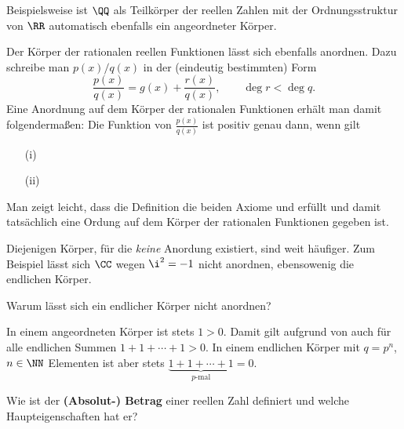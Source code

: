 \begin{antwort}
  Beispielsweise ist $\QQ$ als Teilkörper der reellen Zahlen mit der 
  Ordnungsstruktur von $\RR$ automatisch ebenfalls 
  ein angeordneter Körper. 

  Der Körper der rationalen reellen 
  Funktionen
  lässt sich ebenfalls anordnen. 
  Dazu schreibe man $p(x)/q(x)$ in der (eindeutig bestimmten) Form 
  \[
  \frac{p(x)}{q(x)} = g(x)+ \frac{r(x)}{q(x)} , \qquad \deg r < \deg q.
  \]
  Eine Anordnung auf dem Körper der rationalen Funktionen erhält man 
  damit folgendermaßen: Die Funktion von $\frac{p(x)}{q(x)}$ 
  ist positiv genau dann, wenn gilt
  {\setlength{\labelsep}{4mm}
    \begin{itemize}
    \item[(i)]  \\[-3.5mm]
    \item[(ii)]
    \end{itemize}}
  Man zeigt leicht, dass die Definition die beiden Axiome 
   und 
   erfüllt und damit tatsächlich eine Ordung auf dem Körper der 
  rationalen Funktionen gegeben ist.

  Diejenigen Körper, für die \textit{keine} Anordung existiert,  
  sind weit häufiger. Zum Beispiel lässt sich $\CC$ wegen 
  $\i^2=-1$ nicht anordnen, ebensowenig die endlichen Körper. 
  \AntEnd
\end{antwort}

\begin{frage} 
  Warum lässt sich ein endlicher Körper 
  nicht anordnen? 
\end{frage}

\begin{antwort}
  In einem angeordneten Körper ist stets $1>0$. Damit 
  gilt aufgrund von  auch für alle endlichen Summen $
  1+1+\cdots+1 > 0$.
  In einem endlichen Körper mit $q=p^n$, $n\in\NN$ 
  Elementen ist aber stets 
  $\underbrace{1+1+\cdots + 1}_{p\text{-mal}} =0.$\AntEnd
\end{antwort}

\begin{frage} 
  Wie ist der \textbf{(Absolut-) Betrag}
  einer reellen Zahl definiert und welche Haupteigenschaften hat er?
\end{frage}

